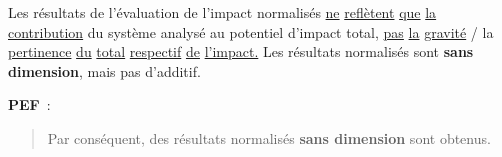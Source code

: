 \begin{description}
{Les résultats de l'évaluation de l'impact normalisés \underline{ne} \underline{reflètent} \underline{que} \underline{la} \underline{contribution} du système analysé au potentiel d'impact total, \underline{pas} \underline{la} \underline{gravité} / la \underline{pertinence} \underline{du} \underline{total} \underline{respectif} \underline{de} \underline{l'impact.}
Les résultats normalisés sont \textbf{sans dimension}, mais pas d'additif.
}
\item \textbf{PEF}~:
\blockcquote[traduction, 6.2.1 Normalisation of Environmental Footprint Impact
Assessment Results (\underline{\textbf{recommended}})]{commission_europeenne_commission_2013}{
Par conséquent, des résultats normalisés \textbf{sans dimension} sont obtenus.
}.
\end{description}


